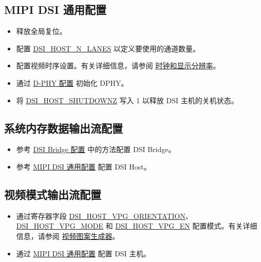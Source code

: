 \documentclass[main\_\_CN.tex]{subfiles}
\begin{document}
\subsection{MIPI DSI 通用配置}
\label{sec:mipidsi-dsi-common-programming-proc}
\begin{itemize}
    \item 释放全局复位。
    \item 配置 \hyperref[fielddesc:DSIHOSTNLANES]{DSI\_HOST\_N\_LANES} 以定义要使用的通道数量。
    \item 配置视频时序设置。有关详细信息，请参阅 \hyperref[sec:clocks-and-display-resolution]{时钟和显示分辨率}。
    \item 通过 \hyperref[sec:mipidsi-dsi-dphy-programming-proc]{D-PHY 配置} 初始化 DPHY。
    \item 将 \hyperref[fielddesc:DSIHOSTSHUTDOWNZ]{DSI\_HOST\_SHUTDOWNZ} 写入 1 以释放 DSI 主机的关机状态。
\end{itemize}

\subsection{系统内存数据输出流配置}
\begin{itemize}
    \item 参考 \hyperref[sec:dsi-bridge-configuration]{DSI Bridge 配置} 中的方法配置 DSI Bridge。
    \item 参考 \hyperref[sec:mipidsi-dsi-common-programming-proc]{MIPI DSI 通用配置} 配置 DSI Host。
\end{itemize}

\subsection{视频模式输出流配置}
\begin{itemize}
    \item 通过寄存器字段 \hyperref[fielddesc:DSIHOSTVPGORIENTATION]{DSI\_HOST\_VPG\_ORIENTATION}、\hyperref[fielddesc:DSIHOSTVPGMODE]{DSI\_HOST\_VPG\_MODE} 和 \hyperref[fielddesc:DSIHOSTVPGEN]{DSI\_HOST\_VPG\_EN} 配置模式。有关详细信息，请参阅 \hyperref[sec:video-pattern-generator]{视频图案生成器}。
    \item 通过 \hyperref[sec:mipidsi-dsi-common-programming-proc]{MIPI DSI 通用配置} 配置 DSI 主机。
\end{itemize}
\end{document}
